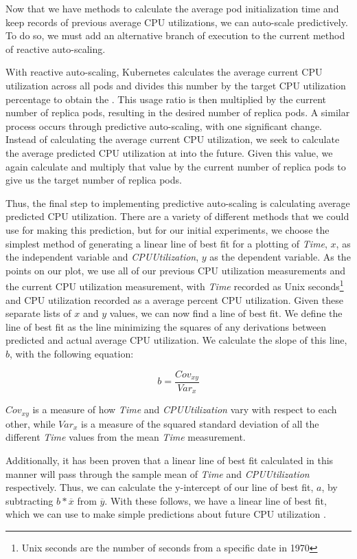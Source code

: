 Now that we have methods to calculate the average pod initialization time and
keep records of previous average CPU utilizations, we can auto-scale
predictively. To do so, we must add an alternative branch of execution to the
current method of reactive auto-scaling.

With reactive auto-scaling, Kubernetes calculates the average current CPU utilization
across all pods and divides this number by the target CPU utilization
percentage to obtain the . This usage ratio is then multiplied
by the current number of replica pods, resulting in the desired number of
replica pods. A similar process occurs through predictive auto-scaling, with one
significant change. Instead of calculating the average current CPU utilization,
we seek to calculate the average predicted CPU utilization at
 into the future. Given this value, we again
calculate  and multiply that value by the current number of
replica pods to give us the target number of replica pods.

Thus, the final step to implementing predictive auto-scaling is calculating
average predicted CPU utilization. There are a variety of different methods that
we could use for making this prediction, but for our initial experiments, we
choose the simplest method of generating a linear line of best fit for a
plotting of \textit{Time}, $x$, as the independent variable and
\textit{CPUUtilization}, $y$ as the dependent variable. As the points on our plot, we
use all of our previous CPU utilization measurements and the current CPU
utilization measurement, with \textit{Time}
recorded as Unix seconds\footnote{Unix seconds are the number of seconds from a
specific date in 1970} and CPU utilization recorded as a average percent CPU
utilization. Given these separate lists of $x$ and $y$ values, we can now find a
line of best fit. We define the line of best fit as the line minimizing the
squares of any derivations between predicted and actual average CPU utilization.
We calculate the slope of this line, $b$, with the following equation:

\[ b = \frac{Cov_{xy}}{Var_{x}}\]

$Cov_{xy}$ is a measure of how \textit{Time} and \textit{CPUUtilization} vary
with respect to each other, while $Var_{{x}}$ is a measure of the squared standard
deviation of all the different \textit{Time} values from the mean \textit{Time}
measurement.

Additionally, it has been proven that a linear line of best fit calculated in
this manner will pass through the sample mean of \textit{Time} and
\textit{CPUUtilization} respectively. Thus, we can calculate the y-intercept of
our line of best fit, $a$, by subtracting $b * \overline{x}$ from $\overline{y}$. With
these follows, we have a linear line of best fit, which we can use to make
simple predictions about future CPU utilization \cite{line-of-best-fit}.

